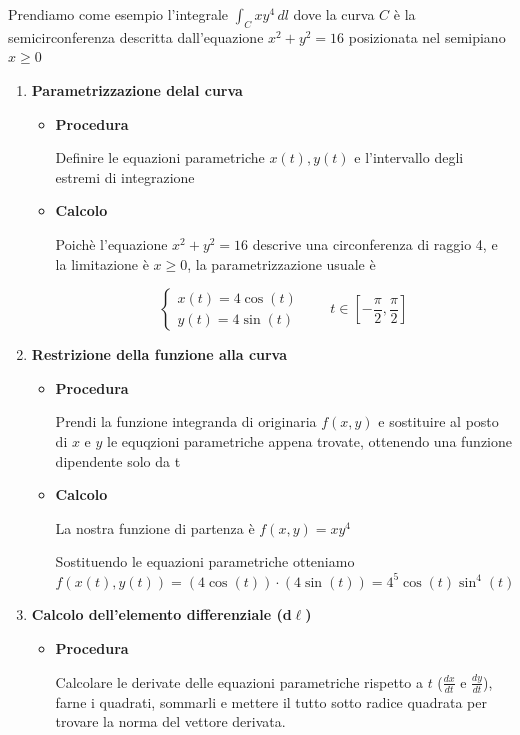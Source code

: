 Prendiamo come esempio l'integrale $\int_C xy^4 \, dl$ dove la curva $C$ è la semicirconferenza descritta dall'equazione $x^2+y^2=16$ posizionata nel semipiano $x \ge 0$
\begin{enumerate}
    \item \textbf{Parametrizzazione delal curva}
        \begin{itemize}
            \item \textbf{Procedura}

            Definire le equazioni parametriche $x(t),y(t)$ e l'intervallo degli estremi di integrazione
            \item \textbf{Calcolo}
            
            Poichè l'equazione $x^2+y^2=16$ descrive una circonferenza di raggio 4, e la limitazione è $x \ge 0$, la parametrizzazione usuale è 

            $$
                \begin{cases}
                    x(t)=4\cos(t) \\ y(t)=4\sin(t)
                \end{cases} \qquad t\in[-\frac{\pi}{2},\frac{\pi}{2}]
            $$

        \end{itemize}

    \item \textbf{Restrizione della funzione alla curva}
        \begin{itemize}
            \item \textbf{Procedura}

            Prendi la funzione integranda di originaria $f(x,y)$ e sostituire al posto di $x$ e $y$ le equqzioni parametriche appena trovate, ottenendo una funzione dipendente solo da t
            \item \textbf{Calcolo}

            La nostra funzione di partenza è $f(x,y)=xy^4$

            Sostituendo le equazioni parametriche otteniamo 
            $f(x(t),y(t))=(4\cos(t))\cdot(4\sin(t))=4^5\cos(t)\sin^4(t)$
        \end{itemize}
    \item \textbf{Calcolo dell'elemento differenziale (d$\ell$)}
        \begin{itemize}
            \item \textbf{Procedura}

            Calcolare le derivate delle equazioni parametriche rispetto a $t$ ($\frac{dx}{dt}$ e $\frac{dy}{dt}$), farne i quadrati, sommarli e mettere il tutto sotto radice quadrata per trovare la norma del vettore derivata.


\end{itemize}
\end{enumerate}
